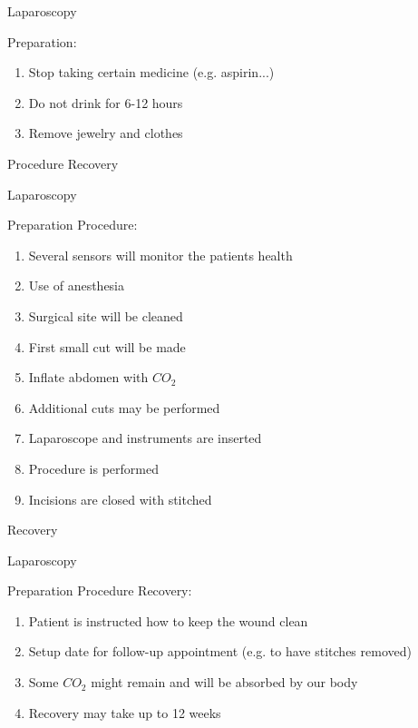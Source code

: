 


\begin{frame}{Laparoscopy}

	\begin{itemize}
		\bolditem Preparation:
		\begin{enumerate}
			\item Stop taking certain medicine (e.g. aspirin...)
			\item Do not drink for 6-12 hours
			\item Remove jewelry and clothes
		\end{enumerate}
		\bolditem Procedure
		\bolditem Recovery
	\end{itemize}

\end{frame}



\begin{frame}{Laparoscopy}

	\begin{itemize}
		\bolditem Preparation
		\bolditem Procedure:
		\begin{enumerate}
			\item Several sensors will monitor the patients health
			\item Use of anesthesia
			\item Surgical site will be cleaned
			\item First small cut will be made
			\item Inflate abdomen with $CO_2$
			\item Additional cuts may be performed
			\item Laparoscope and instruments are inserted
			\item Procedure is performed
			\item Incisions are closed with stitched
		\end{enumerate}
		\bolditem Recovery
	\end{itemize}

\end{frame}



\begin{frame}{Laparoscopy}

	\begin{itemize}
		\bolditem{} Preparation
		\bolditem{} Procedure
		\bolditem{} Recovery:
		\begin{enumerate}
			\item Patient is instructed how to keep the wound clean
			\item Setup date for follow-up appointment (e.g. to have stitches removed)
			\item Some $CO_2$ might remain and will be absorbed by our body
			\item Recovery may take up to 12 weeks
		\end{enumerate}
	\end{itemize}

\end{frame}



